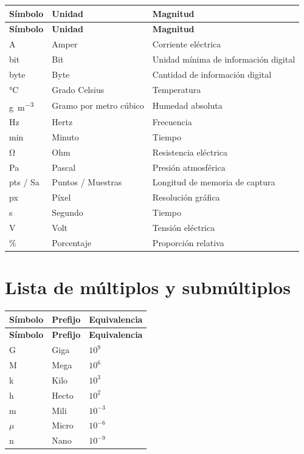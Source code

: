 \begin{xltabular}{\linewidth}{llX}
    \toprule
    \textbf{Símbolo} & \textbf{Unidad} & \textbf{Magnitud} \\
    \midrule
    \endfirsthead

    \toprule
    \textbf{Símbolo} & \textbf{Unidad} & \textbf{Magnitud} \\
    \midrule
    \endhead

    \midrule
    \endfoot

    \bottomrule
    \endlastfoot

    \unit{\ampere} & Amper & Corriente eléctrica\\
    bit & Bit & Unidad mínima de información digital\\
    byte & Byte & Cantidad de información digital\\
    \unit{\degreeCelsius} & Grado Celsius & Temperatura\\
    \unit{\gram\per\cubic\meter} & Gramo por metro cúbico & Humedad absoluta\\
    \unit{\hertz} & Hertz & Frecuencia\\
    \unit{\minute} & Minuto & Tiempo\\
    \unit{\ohm} & Ohm & Resistencia eléctrica\\
    \unit{\pascal} & Pascal & Presión atmosférica\\
    pts / Sa & Puntos / Muestras & Longitud de memoria de captura\\
    px & Píxel & Resolución gráfica\\
    \unit{\second} & Segundo & Tiempo\\
    \unit{\volt} & Volt & Tensión eléctrica\\
    \unit{\percent} & Porcentaje & Proporción relativa\\
\end{xltabular}

\section*{Lista de múltiplos y submúltiplos}

\begin{xltabular}{\linewidth}{llX}
    \toprule
    \textbf{Símbolo} & \textbf{Prefijo} & \textbf{Equivalencia} \\
    \midrule
    \endfirsthead

    \toprule
    \textbf{Símbolo} & \textbf{Prefijo} & \textbf{Equivalencia} \\
    \midrule
    \endhead

    \midrule
    \endfoot

    \bottomrule
    \endlastfoot

    G & Giga& $10^9$\\
    M & Mega& $10^6$\\
    k & Kilo& $10^3$\\
    h & Hecto& $10^2$\\
    m & Mili& $10^{-3}$\\
    $\mu$ & Micro& $10^{-6}$\\
    n & Nano& $10^{-9}$\\
\end{xltabular}